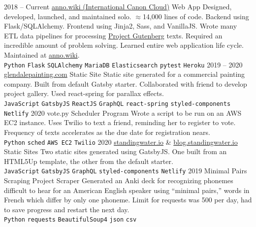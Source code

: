 \documentclass[9pt]{developercv} %
\begin{document}
\begin{entrylist}
	\entry
		{2018 -- Current}
        {{\href{https://github.com/malan88/icc}{anno.wiki (International Canon Cloud)}}}
		{Web App}
        {Designed, developed, launched, and maintained solo. $\approx$14,000
        lines of code. Backend using Flask/SQLAlchemy. Frontend using Jinja2,
        Sass, and VanillaJS. Wrote many ETL data pipelines for processing
        {\href{https://gutenberg.org}{Project Gutenberg}} texts. Required an
        incredible amount of problem solving. Learned entire web application
        life cycle. Maintained at {\href{https://anno.wiki}{anno.wiki}}.
        \\
        \texttt{Python}\slashsep
        \texttt{Flask}\slashsep
        \texttt{SQLAlchemy}\slashsep
        \texttt{MariaDB}\slashsep
        \texttt{Elasticsearch}\slashsep
        \texttt{pytest}\slashsep
        \texttt{Heroku}
        }
	\entry
		{2019 -- 2020}
        {{\href{https://glendalepainting.netlify.app}{glendalepainting.com}}}
		{Static Site}
		{Static site generated for a commercial painting company. Built from
        default Gatsby starter. Collaborated with friend to develop project
        gallery. Used react-spring for parallax effects.
        \\
        \texttt{JavaScript}\slashsep
        \texttt{GatsbyJS}\slashsep
        \texttt{ReactJS}\slashsep
        \texttt{GraphQL}\slashsep
        \texttt{react-spring}\slashsep
        \texttt{styled-components}\slashsep
        \texttt{Netlify}
        }
	\entry
		{2020}
		{vote.py}
		{Scheduler Program}
		{Wrote a script to be run on an AWS EC2 instance. Uses Twilio to text a
        friend, reminding her to register to vote. Frequency of texts
        accelerates as the due date for registration nears.
        \\
        \texttt{Python}\slashsep
        \texttt{sched}\slashsep
        \texttt{AWS EC2}\slashsep
        \texttt{Twilio}
        }
    \entry
        {2020}
        {
            {\href{https://standingwater.io}{standingwater.io}}
            \& {\href{https://blog.standingwater.io}{blog.standingwater.io}}
        }
        {Static Sites}
        {Two static sites generated using GatsbyJS. One built from an HTML5Up
        template, the other from the default starter.
        \\
        \texttt{JavaScript}\slashsep
        \texttt{GatsbyJS}\slashsep
        \texttt{GraphQL}\slashsep
        \texttt{styled-components}\slashsep
        \texttt{Netlify}
        }
	\entry
		{2019}
		{Minimal Pairs Scraping Project}
		{Scraper}
        {Generated an Anki deck for recognizing phonemes difficult to hear for
        an American English speaker using “minimal pairs,” words in French which
        differ by only one phoneme. Limit for requests was 500 per day, had to
        save progress and restart the next day.
        \\
        \texttt{Python}\slashsep
        \texttt{requests}\slashsep
        \texttt{BeautifulSoup4}\slashsep
        \texttt{json}\slashsep
        \texttt{csv}
        }
\end{entrylist}
\end{document}
